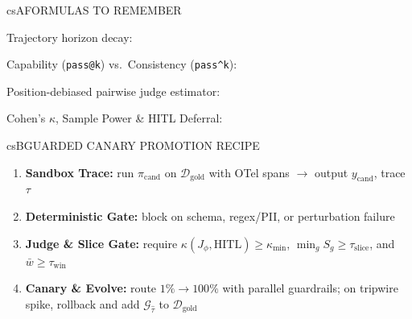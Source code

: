 \documentclass[../../../../master.tex]{subfiles}
\begin{document}
\begin{cscolumns}
\begin{cscard}{csA}{FORMULAS TO REMEMBER}
  \begin{csbul}
    \item Trajectory horizon decay:
    \item Capability (\texttt{pass@k}) vs.\ Consistency (\texttt{pass\textasciicircum k}):
    \item Position-debiased pairwise judge estimator:
    \item Cohen's $\kappa$, Sample Power \& HITL Deferral:
  \end{csbul}
\end{cscard}

\begin{cscard}{csB}{GUARDED CANARY PROMOTION RECIPE}
  \begin{enumerate}[leftmargin=1.2em, itemsep=1pt, topsep=1pt, parsep=0pt]
    \item \textbf{Sandbox Trace:} run $\pi_{\mathrm{cand}}$ on $\mathcal{D}_{\mathrm{gold}}$ with OTel spans $\to$ output $y_{\mathrm{cand}}$, trace $\tau$
    \item \textbf{Deterministic Gate:} block on schema, regex/PII, or perturbation failure
    \item \textbf{Judge \& Slice Gate:} require $\kappa(J_\phi,\mathrm{HITL})\ge\kappa_{\min}$, $\min_g S_g\ge\tau_{\mathrm{slice}}$, and $\bar w\ge\tau_{\mathrm{win}}$
    \item \textbf{Canary \& Evolve:} route $1\%\to 100\%$ with parallel guardrails; on tripwire spike, rollback and add $\mathcal{G}_{\hat\tau}$ to $\mathcal{D}_{\mathrm{gold}}$
  \end{enumerate}
\end{cscard}
\columnbreak


\end{cscolumns}
\end{document}
